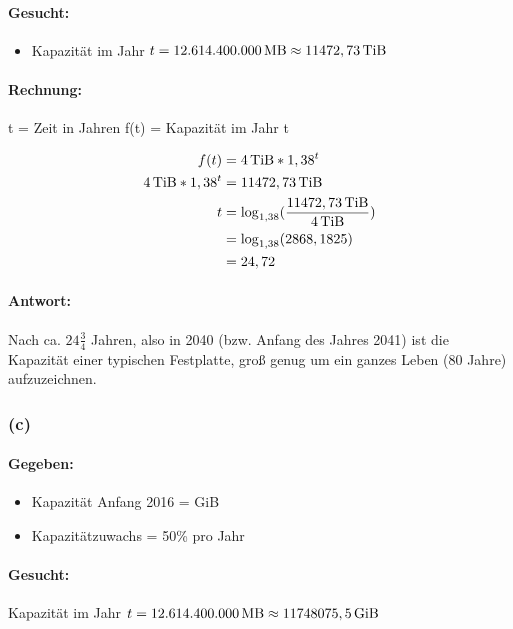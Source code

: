 \documentclass[11pt,a4paper]{article}
\begin{document}
\paragraph{Gesucht:}

\begin{itemize}
    \item Kapazität im Jahr $t = \unit[12.614.400.000]{MB} \approx \unit[11472,73]{TiB}$
\end{itemize}

\paragraph{Rechnung:}

    t = Zeit in Jahren
    f(t) = Kapazität im Jahr t

\begin{align}
    f(t) &= \unit[4]{TiB}*1,38^{t}\\
    \unit[4]{TiB} * 1,38^{t} &= \unit[11472,73]{TiB}\\
    t &= \log_{1,38}(\frac{\unit[11472,73]{TiB}}{\unit[4]{TiB}})\\
      &= \log_{1,38}(2868,1825)\\
      &= 24,72
\end{align}

\paragraph{Antwort:}
Nach ca. $24\frac{3}{4}$ Jahren, also in 2040 (bzw. Anfang des Jahres 2041) ist die Kapazität einer typischen Festplatte, groß genug um ein ganzes Leben (80 Jahre) aufzuzeichnen.


\subsubsection{(c)} %

\paragraph{Gegeben:}
\begin{itemize}
    \item Kapazität Anfang 2016 = \unit[128]{GiB}\\
    \item Kapazitätzuwachs = 50\% pro Jahr
\end{itemize}

\paragraph{Gesucht:}
    Kapazität im Jahr $t = \unit[12.614.400.000]{MB} \approx \unit[11748075,5]{GiB}$
\end{document}
